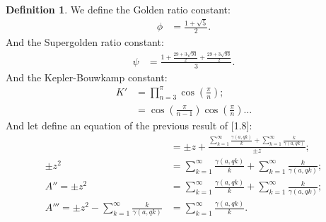 \documentclass[10pt]{article}
\theoremstyle{plain}
\theoremstyle{definition}
\newtheorem{definition}[theorem]{Definition}
\theoremstyle{remark}
\begin{document}
	\begin{definition}
		We define the Golden ratio constant:
		\begin{align*}
			\phi &= \frac{1+\sqrt{5}}{2}.
		\end{align*}
		And the Supergolden ratio constant:
		\begin{align*}
			\psi &= \frac{1+\frac{29+3\sqrt{93}}{2}+\frac{29+3\sqrt{93}}{2}}{3}.
		\end{align*}
		And the Kepler-Bouwkamp constant:
		\begin{align*}
			K' &= \prod_{n=3}^{\pi} \cos(\frac{\pi}{n});\\
			&=  \cos(\frac{\pi}{n-1}) \cos(\frac{\pi}{n}) \dots
		\end{align*}
		And let define an equation of the previous result of [1.8]:
		\begin{align*}
			&= \pm z + \frac{\sum_{k=1}^{\infty} \frac{\gamma(a, qk)}{k} + \sum_{k=1}^{\infty}\frac{k}{\gamma(a, qk)}}{\pm z};\\
			\pm z^2 &= \sum_{k=1}^{\infty} \frac{\gamma(a, qk)}{k} + \sum_{k=1}^{\infty}\frac{k}{\gamma(a, qk)};\\
			A'' = \pm z^2 &= \sum_{k=1}^{\infty} \frac{\gamma(a, qk)}{k} + \sum_{k=1}^{\infty}\frac{k}{\gamma(a, qk)};\\
			A''' = \pm z^{2} - \sum_{k=1}^{\infty}\frac{k}{\gamma(a, qk)} &= \sum_{k=1}^{\infty} \frac{\gamma(a, qk)}{k}.
		\end{align*}
	\end{definition}
	
	\nocite{*}
	
	
	
	
\end{document}
